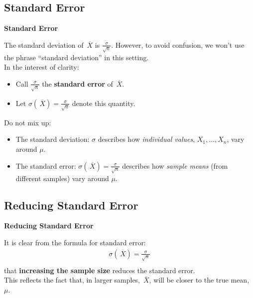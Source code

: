 \documentclass[compress]{beamer}        %
\makeatletter
\newcommand{\tcb}{\textcolor{beamer@blendedblue}}
\makeatother
\begin{document}
\subsection{Standard Error}
\begin{frame}{\bf \tcb{Standard Error}}

The standard deviation of $\,\overline{\!X}$ is $\frac{\sigma}{\sqrt{n}}$. However, to avoid confusion, we won't use the phrase ``standard deviation'' in this setting.\\[0.4cm]

In the interest of clarity:\\
\begin{itemize}\itemsep0.3cm
\item Call $\frac{\sigma}{\sqrt{n}}$ the {\bf standard error} of $\,\overline{\!X}$.
\item Let {\boldmath$\sigma(\,\overline{\!X}) = \frac{\sigma}{\sqrt{n}}$} denote this quantity.\\[0.8cm]
\end{itemize}


Do not mix up:
\begin{itemize}
\item The standard deviation: $\sigma$ describes how \emph{individual values}, $X_1,\ldots,X_n$, vary around $\mu$.\\[0.3cm]
\item The standard error: $\sigma(\,\overline{\!X}) = \frac{\sigma}{\sqrt{n}}$ describes how \emph{sample means} (from different samples) vary around $\mu$.
\end{itemize}
\end{frame}





\subsection{Reducing Standard Error}
\begin{frame}{\bf \tcb{Reducing Standard Error}}

It is clear from the formula for standard error:\\
\begin{align*}
\sigma(\,\overline{\!X}) = \frac{\sigma}{\sqrt{n}}\\
\end{align*}
that {\bf increasing the sample size} reduces the standard error.\\[1.2cm]

This reflects the fact that, in larger samples, $\,\overline{\!X}$, will be closer to the true mean, $\mu$.

\end{frame}
\end{document}
